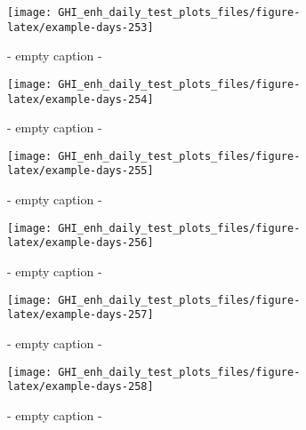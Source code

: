 \documentclass[
  10pt,
  a4paper,oneside]{article}
\begin{document}
\begin{figure}[H]

{\centering \texttt{[image: GHI\_enh\_daily\_test\_plots\_files/figure-latex/example-days-253]} 

}

\caption{ - empty caption - }\label{fig:example-days-253}
\end{figure}

\begin{figure}[H]

{\centering \texttt{[image: GHI\_enh\_daily\_test\_plots\_files/figure-latex/example-days-254]} 

}

\caption{ - empty caption - }\label{fig:example-days-254}
\end{figure}

\begin{figure}[H]

{\centering \texttt{[image: GHI\_enh\_daily\_test\_plots\_files/figure-latex/example-days-255]} 

}

\caption{ - empty caption - }\label{fig:example-days-255}
\end{figure}

\begin{figure}[H]

{\centering \texttt{[image: GHI\_enh\_daily\_test\_plots\_files/figure-latex/example-days-256]} 

}

\caption{ - empty caption - }\label{fig:example-days-256}
\end{figure}

\begin{figure}[H]

{\centering \texttt{[image: GHI\_enh\_daily\_test\_plots\_files/figure-latex/example-days-257]} 

}

\caption{ - empty caption - }\label{fig:example-days-257}
\end{figure}

\begin{figure}[H]

{\centering \texttt{[image: GHI\_enh\_daily\_test\_plots\_files/figure-latex/example-days-258]} 

}

\caption{ - empty caption - }\label{fig:example-days-258}
\end{figure}
\end{document}
